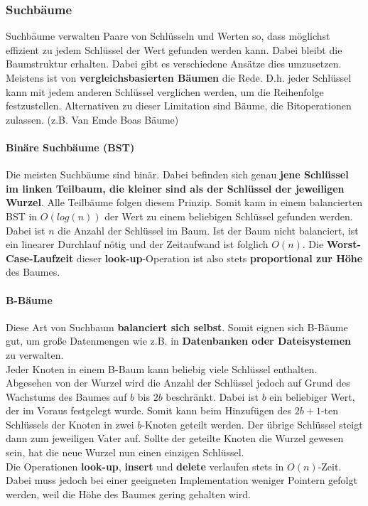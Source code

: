 \documentclass{article}
\begin{document}
\subsubsection{Suchbäume}
Suchbäume verwalten Paare von Schlüsseln und Werten so, dass möglichst effizient zu jedem Schlüssel der Wert gefunden werden kann. Dabei bleibt die Baumstruktur erhalten. Dabei gibt es verschiedene Ansätze dies umzusetzen. Meistens ist von \textbf{vergleichsbasierten Bäumen} die Rede. D.h. jeder Schlüssel kann mit jedem anderen Schlüssel verglichen werden, um die Reihenfolge festzustellen. Alternativen zu dieser Limitation sind Bäume, die Bitoperationen zulassen. (z.B. Van Emde Boas Bäume)
\paragraph{Binäre Suchbäume (BST)}
Die meisten Suchbäume sind binär. Dabei befinden sich genau \textbf{jene Schlüssel im linken Teilbaum, die kleiner sind als der Schlüssel der jeweiligen Wurzel}. Alle Teilbäume folgen diesem Prinzip. Somit kann in einem balancierten BST in $O(log(n))$ der Wert zu einem beliebigen Schlüssel gefunden werden. Dabei ist $n$ die Anzahl der Schlüssel im Baum. Ist der Baum nicht balanciert, ist ein linearer Durchlauf nötig und der Zeitaufwand ist folglich $O(n)$. Die \textbf{Worst-Case-Laufzeit} dieser \textbf{look-up}-Operation ist also stets \textbf{proportional zur Höhe} des Baumes.
\paragraph{B-Bäume}
Diese Art von Suchbaum \textbf{balanciert sich selbst}. Somit eignen sich B-Bäume gut, um große Datenmengen wie z.B. in \textbf{Datenbanken oder Dateisystemen} zu verwalten.\\
Jeder Knoten in einem B-Baum kann beliebig viele Schlüssel enthalten. Abgesehen von der Wurzel wird die Anzahl der Schlüssel jedoch auf Grund des Wachstums des Baumes auf $b$ bis $2b$ beschränkt. Dabei ist $b$ ein beliebiger Wert, der im Voraus festgelegt wurde. Somit kann beim Hinzufügen des $2b+1$-ten Schlüssels der Knoten in zwei $b$-Knoten geteilt werden. Der übrige Schlüssel steigt dann zum jeweiligen Vater auf. Sollte der geteilte Knoten die Wurzel gewesen sein, hat die neue Wurzel nun einen einzigen Schlüssel.\\
Die Operationen \textbf{look-up}, \textbf{insert} und \textbf{delete} verlaufen stets in $O(n)$-Zeit. Dabei muss jedoch bei einer geeigneten Implementation weniger Pointern gefolgt werden, weil die Höhe des Baumes gering gehalten wird.
\end{document}
